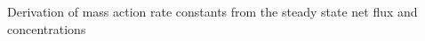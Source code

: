 Derivation of mass action rate constants   from the steady state net flux and concentrations          